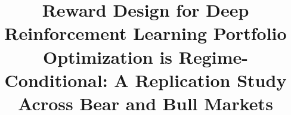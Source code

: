 \documentclass[conference]{IEEEtran}
\begin{document}
\title{Reward Design for Deep Reinforcement Learning Portfolio\\
Optimization is Regime-Conditional: A Replication Study\\
Across Bear and Bull Markets}

\author{
\and
{}
}

\maketitle
\end{document}
